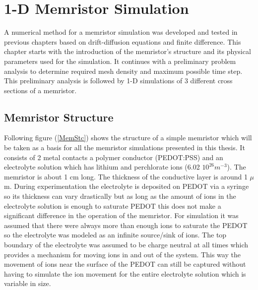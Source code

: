 
\chapter{1-D Memristor Simulation} %

\label{Chapter5} %


A numerical method for a memristor simulation was developed and tested in previous chapters based on drift-diffusion equations and finite difference. This chapter starts with the introduction of the memristor's structure and its physical parameters used for the simulation. It continues with a preliminary problem analysis to determine required mesh density and maximum possible time step. This preliminary analysis is followed by 1-D simulations of 3 different cross sections of a memristor.

\section{Memristor Structure}
Following figure (\ref{MemStc}) shows the structure of a simple memristor which will be taken as a basis for all the memristor simulations presented in this thesis. It consists of 2 metal contacts a polymer conductor (PEDOT:PSS) and an electrolyte solution which has lithium and perchlorate ions (6.02 $10^{26} m^{-3}$). The memristor is about 1 cm long. The thickness of the conductive layer is around 1 $\mu$m. During experimentation the electrolyte is deposited on PEDOT via a syringe so its thickness can vary drastically but as long as the amount of ions in the electrolyte solution is enough to saturate PEDOT this does not make a significant difference in the operation of the memristor. For simulation it was assumed that there were always more than enough ions to saturate the PEDOT so the electrolyte was modeled as an infinite source/sink of ions. The top boundary of the electrolyte was assumed to be charge neutral at all times which provides a mechanism for moving ions in and out of the system. This way the movement of ions near the surface of the PEDOT can still be captured without having to simulate the ion movement for the entire electrolyte solution which is variable in size. 

